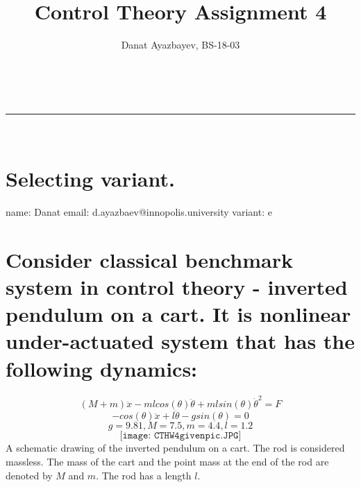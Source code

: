 \documentclass[a4paper,11pt]{article}
\makeatletter
\newcommand{\linia}{\rule{\linewidth}{0.5pt}}
\theoremstyle{mytheor}
\renewcommand{\maketitle}{
\begin{center}
\vspace{2ex}
{\huge \textsc{\@title}}
\vspace{1ex}
\\
\linia\\
\@author \hfill \@date
\vspace{4ex}
\end{center}
}
\makeatother
\begin{document}
\title{Control Theory Assignment \textnumero{} 4}

\author{Danat Ayazbayev, BS-18-03}

\maketitle

\section*{Selecting variant.}
name: Danat\newline
email: d.ayazbaev@innopolis.university\newline
variant: e

\section*{Consider classical benchmark system in control theory - inverted pendulum on a cart. It is nonlinear under-actuated system that has the following dynamics:}
\[
(M+m)\ddot{x}-mlcos(\theta)\ddot{\theta}+mlsin(\theta)\dot{\theta}^{2}=F
\]
\[
-cos(\theta)\ddot{x}+l\ddot{\theta}-gsin(\theta)=0
\]
\[
g=9.81, M=7.5, m=4.4, l=1.2
\]
\[
\texttt{[image: CTHW4givenpic.JPG]}
\]
A schematic drawing of the inverted pendulum on a cart. The rod is considered massless. The mass of the cart and the point mass at the end of the rod are denoted by $M$ and $m$. The rod has a length $l$.
\end{document}
